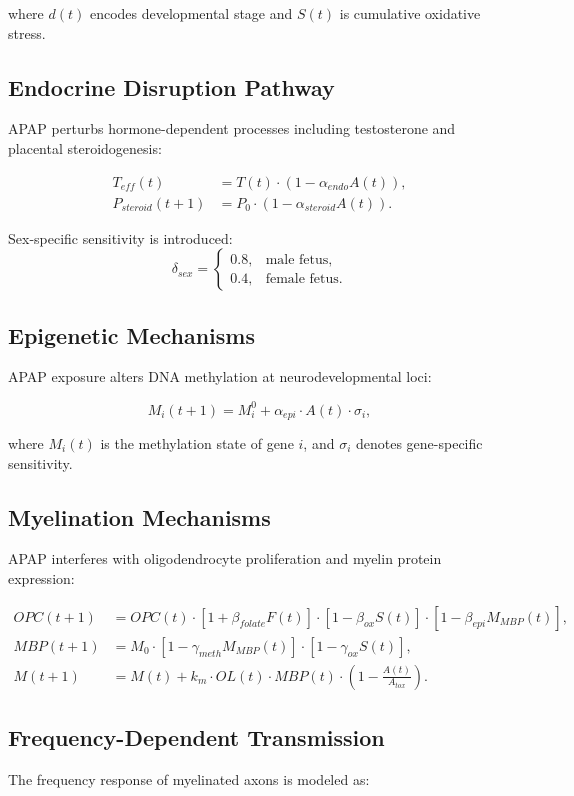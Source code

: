 \documentclass[12pt]{article}
\begin{document}
where $d(t)$ encodes developmental stage and $S(t)$ is cumulative oxidative stress.

\subsection{Endocrine Disruption Pathway}
APAP perturbs hormone-dependent processes including testosterone and placental steroidogenesis:

\begin{align}
T_{eff}(t) &= T(t) \cdot \left(1 - \alpha_{endo}A(t)\right), \\
P_{steroid}(t+1) &= P_0 \cdot \left(1 - \alpha_{steroid}A(t)\right).
\end{align}

Sex-specific sensitivity is introduced:
\[
\delta_{sex} = \begin{cases}
0.8, & \text{male fetus}, \\
0.4, & \text{female fetus}.
\end{cases}
\]

\subsection{Epigenetic Mechanisms}
APAP exposure alters DNA methylation at neurodevelopmental loci:

\begin{equation}
M_i(t+1) = M_i^0 + \alpha_{epi} \cdot A(t) \cdot \sigma_i,
\end{equation}

where $M_i(t)$ is the methylation state of gene $i$, and $\sigma_i$ denotes gene-specific sensitivity.

\subsection{Myelination Mechanisms}
APAP interferes with oligodendrocyte proliferation and myelin protein expression:

\begin{align}
OPC(t+1) &= OPC(t) \cdot [1 + \beta_{folate}F(t)] \cdot [1 - \beta_{ox}S(t)] \cdot [1 - \beta_{epi}M_{MBP}(t)], \\
MBP(t+1) &= M_0 \cdot [1 - \gamma_{meth}M_{MBP}(t)] \cdot [1 - \gamma_{ox}S(t)], \\
M(t+1) &= M(t) + k_m \cdot OL(t) \cdot MBP(t) \cdot \left(1 - \frac{A(t)}{A_{tox}}\right).
\end{align}

\subsection{Frequency-Dependent Transmission}
The frequency response of myelinated axons is modeled as:
\end{document}
